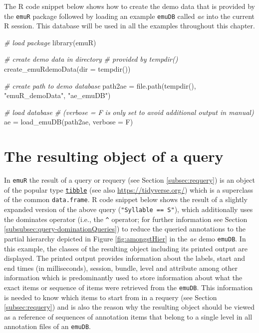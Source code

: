 \documentclass[
]{book}
\newenvironment{Shaded}{\begin{snugshade}}{\end{snugshade}}
\newcommand{\AttributeTok}[1]{\textcolor[rgb]{0.77,0.63,0.00}{#1}}
\newcommand{\CommentTok}[1]{\textcolor[rgb]{0.56,0.35,0.01}{\textit{#1}}}
\newcommand{\FunctionTok}[1]{\textcolor[rgb]{0.00,0.00,0.00}{#1}}
\newcommand{\NormalTok}[1]{#1}
\newcommand{\OtherTok}[1]{\textcolor[rgb]{0.56,0.35,0.01}{#1}}
\newcommand{\StringTok}[1]{\textcolor[rgb]{0.31,0.60,0.02}{#1}}
\begin{document}
The R code snippet below shows how to create the demo data that is provided by the \texttt{emuR} package followed by loading an example \texttt{emuDB} called \emph{ae} into the current R session. This database will be used in all the examples throughout this chapter.

\begin{Shaded}
\begin{Highlighting}[]
\CommentTok{\# load package}
\FunctionTok{library}\NormalTok{(emuR)}

\CommentTok{\# create demo data in directory}
\CommentTok{\# provided by tempdir()}
\FunctionTok{create\_emuRdemoData}\NormalTok{(}\AttributeTok{dir =} \FunctionTok{tempdir}\NormalTok{())}

\CommentTok{\# create path to demo database}
\NormalTok{path2ae }\OtherTok{=} \FunctionTok{file.path}\NormalTok{(}\FunctionTok{tempdir}\NormalTok{(), }\StringTok{"emuR\_demoData"}\NormalTok{, }\StringTok{"ae\_emuDB"}\NormalTok{)}

\CommentTok{\# load database}
\CommentTok{\# (verbose = F is only set to avoid additional output in manual)}
\NormalTok{ae }\OtherTok{=} \FunctionTok{load\_emuDB}\NormalTok{(path2ae, }\AttributeTok{verbose =}\NormalTok{ F)}
\end{Highlighting}
\end{Shaded}

\hypertarget{sec:query-emuRsegs}{%
\section{The resulting object of a query}\label{sec:query-emuRsegs}}

In \texttt{emuR} the result of a query or requery (see Section \ref{subsec:requery}) is an object of the popular type \href{https://tibble.tidyverse.org/}{\texttt{tibble}} (see also \url{https://tidyverse.org/}) which is a superclass of the common \texttt{data.frame}. R code snippet below shows the result of a slightly expanded version of the above query (\texttt{"Syllable\ ==\ S"}), which additionally uses the dominates operator (i.e., the \texttt{\^{}} operator; for further information see Section \ref{subsubsec:query-dominationQueries}) to reduce the queried annotations to the partial hierarchy depicted in Figure \ref{fig:amongstHier} in the \emph{ae} demo \texttt{emuDB}. In this example, the classes of the resulting object including its printed output are displayed. The printed output provides information about the labels, start and end times (in milliseconds), session, bundle, level and attribute among other information which is predominantly used to store information about what the exact items or sequence of items were retrieved from the \texttt{emuDB}. This information is needed to know which items to start from in a requery (see Section \ref{subsec:requery}) and is also the reason why the resulting object should be viewed as a reference of sequences of annotation items that belong to a single level in all annotation files of an \texttt{emuDB}.
\end{document}
